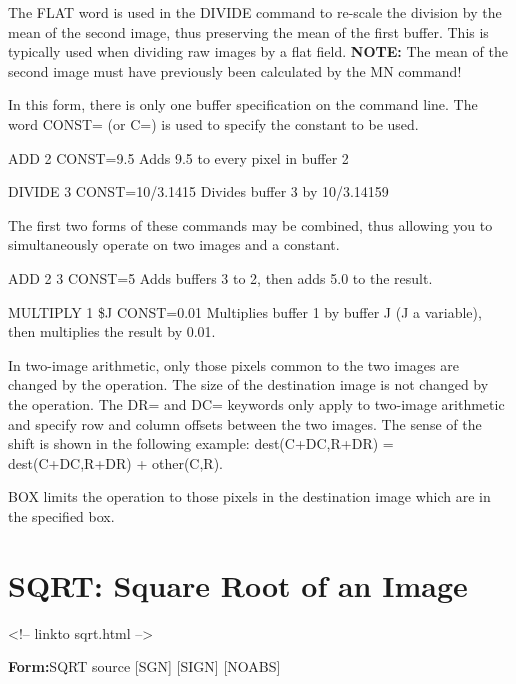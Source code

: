 The FLAT word is used in the DIVIDE command to re-scale the division by the
mean of the second image, thus preserving the mean of the first buffer.
This is typically used when dividing raw images by a flat field.
\textbf{NOTE:} The mean of the second image must have previously been
calculated by the MN command!


In this form, there is only one buffer specification on the command line.
The word CONST= (or C=) is used to specify the constant to be used.
\begin{example}
  \item[ADD 2 CONST=9.5\hfill]{Adds 9.5 to every pixel in buffer 2}
  \item[DIVIDE 3 CONST=10/3.1415\hfill]{  Divides buffer 3 by 10/3.14159}
\end{example}


The first two forms of these commands may be combined, thus allowing you to
simultaneously operate on two images and a constant.
\begin{example}
  \item[ADD 2 3 CONST=5\hfill]{Adds buffers 3 to 2, then adds 5.0
       to the result.}
  \item[MULTIPLY 1 \$J CONST=0.01\hfill]{ Multiplies buffer 1 by buffer J
       (J a variable), then multiplies the result by 0.01.}
\end{example}


In two-image arithmetic, only those pixels common to the two images are
changed by the operation.  The size of the destination image is not changed
by the operation.  The DR= and DC= keywords only apply to two-image
arithmetic and specify row and column offsets between the two images.  The
sense of the shift is shown in the following example: dest(C+DC,R+DR) =
dest(C+DC,R+DR) + other(C,R).

BOX limits the operation to those pixels in the destination image which are
in the specified box.

\section{SQRT: Square Root of an Image}
\begin{rawhtml}
<!-- linkto sqrt.html -->
\end{rawhtml}
\begin{command}
  \item[\textbf{Form:}SQRT source {[SGN]} {[SIGN]} {[NOABS]}\hfill]{}
\end{command}

